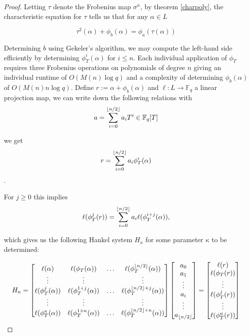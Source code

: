 \documentclass{acmart}
\theoremstyle{remark}
\numberwithin{equation}{section}
\DeclarePairedDelimiter\floor{\lfloor}{\rfloor}
\begin{document}
\begin{proof}
Letting $\tau$ denote the Frobenius map $\sigma^n$, by theorem \ref{charpoly}, the characteristic equation for $\tau$ tells us that for any $\alpha \in L$

\[\tau^2(\alpha) + \phi_b(\alpha) = \phi_a(\tau(\alpha))\]

Determining $b$ using Gekeler's algorithm, we may compute the left-hand side efficiently by determining $\phi_T^i(\alpha)$ for $i \leq n$. Each individual application of $\phi_T$ requires three Frobenius operations on polynomials of degree $n$ giving an individual runtime of $O(M(n) \log q)$ and a complexity of determining $\phi_b(\alpha)$ of $O(M(n) n \log q)$.  Define $r := \alpha + \phi_b(\alpha)$ and $\ell: L \to \mathbb{F}_q$ a linear projection map, we can write down the following relations with
\[a = \sum_{i = 0}^{\floor*{n/2}}a_iT^i \in \mathbb{F}_q[T]\]

\noindent we get
\[ r = \sum_{i = 0}^{\floor*{n/2}}a_i\phi_T^i(\alpha) \].

\noindent For $j \geq 0$ this implies
\[\ell(\phi_T^j(r)) = \sum_{i = 0}^{\floor*{n/2}}a_i\ell(\phi_T^{i+j}(\alpha)),\]

\noindent which gives us the following Hankel system $H_{\kappa}$ for some parameter $\kappa$ to be determined:

\[H_{\kappa} = \begin{bmatrix}\ell(\alpha) & \ell(\phi_T(\alpha)) & \ldots & \ell(\phi_T^{\floor*{n/2}}(\alpha)) \\ \vdots & \vdots & & \vdots \\ 

\ell(\phi_T^{j}(\alpha)) & \ell(\phi_T^{1+j}(\alpha)) & \ldots & \ell(\phi_T^{\floor*{n/2}+j}(\alpha)) \\ \vdots & \vdots & & \vdots \\

\ell(\phi_T^{\kappa}(\alpha)) & \ell(\phi_T^{1 + \kappa }(\alpha)) & \ldots & \ell(\phi_T^{\floor*{n/2} + \kappa}(\alpha))

\end{bmatrix} \begin{bmatrix} a_0 \\ a_1 \\ \vdots \\ a_i \\ \vdots \\ a_{\floor*{n/2}} \end{bmatrix} = \begin{bmatrix} \ell(r) \\ \ell(\phi_T(r)) \\ \vdots \\ \ell(\phi_T^j(r)) \\ \vdots  \\   \ell(\phi_T^{\kappa}(r)) \end{bmatrix} \]


\end{proof}
\end{document}
